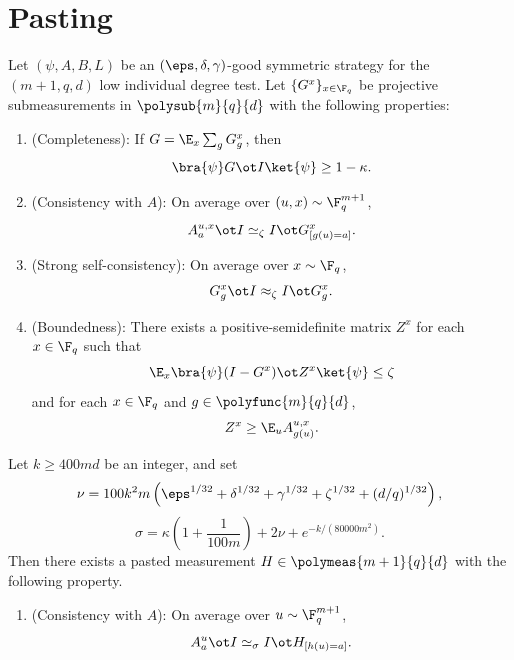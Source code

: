 \chapter{Pasting}
\label{chap:pasting}
\label{sec:ld-pasting}

\begin{theorem}[Pasting]\label{thm:ld-pasting}
	\leanok
	Let $(\psi,A,B,L)$ be an $(\eps,\delta,\gamma)$-good symmetric strategy for the $(m+1,q,d)$ low individual degree test. Let $\{G^x\}_{x \in \F_q}$ be projective submeasurements in $\polysub{m}{q}{d}$ with the following properties:
	\begin{enumerate}
		\item (Completeness): \label{item:ld-pasting-completeness}
		      If $G = \E_x \sum_g G_g^x$, then
		      \[
			      \bra{\psi} G \ot I \ket{\psi} \ge 1-\kappa.
		      \]
		\item (Consistency with $A$): \label{item:ld-pasting-consistency}
		      On average over $(u,x) \sim \F_q^{m+1}$,
		      \[
			      A_a^{u,x} \ot I \simeq_\zeta I \ot G^x_{[g(u)=a]}.
		      \]
		\item (Strong self-consistency): \label{item:ld-pasting-self-consistency}
		      On average over $x \sim \F_q$,
		      \[
			      G_g^x \ot I \approx_\zeta I \ot G_g^x.
		      \]
		\item (Boundedness): \label{item:ld-pasting-boundedness}
		      There exists a positive-semidefinite matrix $Z^x$ for each $x \in \F_q$ such that
		      \[
			      \E_x \bra{\psi} (I-G^x)\ot Z^x \ket{\psi} \le \zeta
		      \]
		      and for each $x \in \F_q$ and $g \in \polyfunc{m}{q}{d}$,
		      \[
			      Z^x \ge \E_u A^{u,x}_{g(u)}.
		      \]
	\end{enumerate}
	Let $k \ge 400md$ be an integer, and set
	\[
		\nu = 100k^2m\left(\eps^{1/32}+\delta^{1/32}+\gamma^{1/32}+\zeta^{1/32}+(d/q)^{1/32}\right),
	\]
	\[
		\sigma = \kappa\left(1+\frac{1}{100m}\right) + 2\nu + e^{-k/(80000m^2)}.
	\]
	Then there exists a pasted measurement $H \in \polymeas{m+1}{q}{d}$ with the following property.
	\begin{enumerate}
		\item (Consistency with $A$): \label{item:ld-pasting-N-consistency}
		      On average over $u \sim \F_q^{m+1}$,
		      \[
			      A_a^u \ot I \simeq_\sigma I \ot H_{[h(u)=a]}.
		      \]
	\end{enumerate}
\end{theorem}

